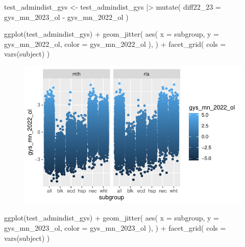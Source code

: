 \documentclass[
  letterpaper,
  DIV=11,
  numbers=noendperiod]{scrartcl}
\newenvironment{Shaded}{\begin{snugshade}}{\end{snugshade}}
\newcommand{\AttributeTok}[1]{\textcolor[rgb]{0.40,0.45,0.13}{#1}}
\newcommand{\FunctionTok}[1]{\textcolor[rgb]{0.28,0.35,0.67}{#1}}
\newcommand{\NormalTok}[1]{\textcolor[rgb]{0.00,0.23,0.31}{#1}}
\newcommand{\OtherTok}[1]{\textcolor[rgb]{0.00,0.23,0.31}{#1}}
\newcommand{\SpecialCharTok}[1]{\textcolor[rgb]{0.37,0.37,0.37}{#1}}
\begin{document}
\begin{Shaded}
\begin{Highlighting}[]
\NormalTok{test\_admindist\_gys }\OtherTok{\textless{}{-}}\NormalTok{ test\_admindist\_gys }\SpecialCharTok{|\textgreater{}}
  \FunctionTok{mutate}\NormalTok{(}
    \AttributeTok{diff22\_23 =}\NormalTok{ gys\_mn\_2023\_ol }\SpecialCharTok{{-}}\NormalTok{ gys\_mn\_2022\_ol}
\NormalTok{  )}

\FunctionTok{ggplot}\NormalTok{(test\_admindist\_gys) }\SpecialCharTok{+}
  \FunctionTok{geom\_jitter}\NormalTok{(}
    \FunctionTok{aes}\NormalTok{(}
      \AttributeTok{x =}\NormalTok{ subgroup,}
      \AttributeTok{y =}\NormalTok{ gys\_mn\_2022\_ol,}
      \AttributeTok{color =}\NormalTok{ gys\_mn\_2022\_ol}
\NormalTok{      ),}
\NormalTok{    ) }\SpecialCharTok{+}
  \FunctionTok{facet\_grid}\NormalTok{(}
    \AttributeTok{cols =} \FunctionTok{vars}\NormalTok{(subject)}
\NormalTok{  )}
\end{Highlighting}
\end{Shaded}

\begin{figure}[H]

{\centering \includegraphics{GeospatialMapping_files/figure-pdf/district-scores-scatter-1.pdf}

}

\end{figure}

\begin{Shaded}
\begin{Highlighting}[]
\FunctionTok{ggplot}\NormalTok{(test\_admindist\_gys) }\SpecialCharTok{+}
  \FunctionTok{geom\_jitter}\NormalTok{(}
    \FunctionTok{aes}\NormalTok{(}
      \AttributeTok{x =}\NormalTok{ subgroup,}
      \AttributeTok{y =}\NormalTok{ gys\_mn\_2023\_ol,}
      \AttributeTok{color =}\NormalTok{ gys\_mn\_2023\_ol}
\NormalTok{      ),}
\NormalTok{    ) }\SpecialCharTok{+}
  \FunctionTok{facet\_grid}\NormalTok{(}
    \AttributeTok{cols =} \FunctionTok{vars}\NormalTok{(subject)}
\NormalTok{  ) }
\end{Highlighting}
\end{Shaded}
\end{document}
